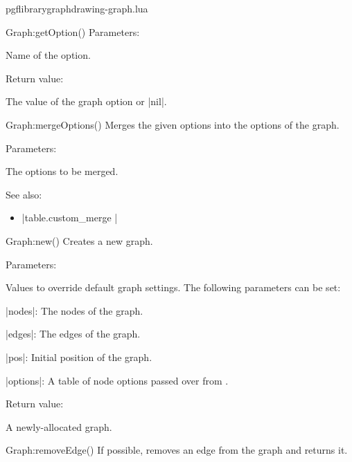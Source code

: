 \begin{filedescription}{pgflibrarygraphdrawing-graph.lua}
\begin{luacommand}{{Graph:getOption}()}
Parameters:
\begin{parameterdescription}
	\item[\meta{name}] Name of the option. 
\end{parameterdescription}


Return value:
\begin{parameterdescription} 
  \item[] The value of the graph option  or |nil|. 
\end{parameterdescription}


\end{luacommand}
\begin{luacommand}{{Graph:mergeOptions}()}
Merges the given options into the options of the graph. 

Parameters:
\begin{parameterdescription}
	\item[\meta{options}] The options to be merged. 
\end{parameterdescription}



See also:
\begin{itemize}
	\item[] |table.custom_merge |
\end{itemize}

\end{luacommand}
\begin{luacommand}{{Graph:new}()}
Creates a new graph. 

Parameters:
\begin{parameterdescription}
	\item[\meta{values}] Values to override default graph settings. The following parameters can be set:\par |nodes|: The nodes of the graph.\par |edges|: The edges of the graph.\par |pos|: Initial position of the graph.\par |options|: A table of node options passed over from \tikzname. 
\end{parameterdescription}


Return value:
\begin{parameterdescription} 
  \item[] A newly-allocated graph. 
\end{parameterdescription}


\end{luacommand}
\begin{luacommand}{{Graph:removeEdge}()}
If possible, removes an edge from the graph and returns it. 


\end{luacommand}
\end{filedescription}
